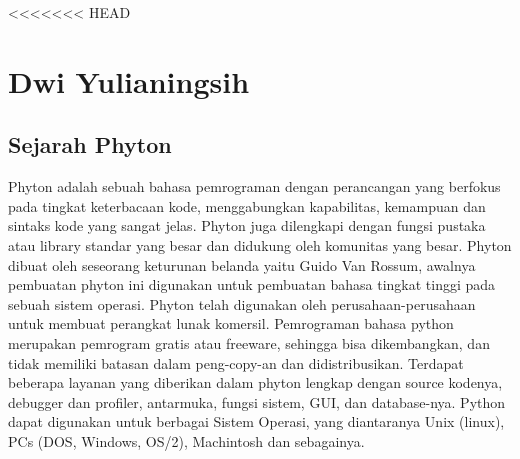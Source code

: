 <<<<<<< HEAD
\section{Dwi Yulianingsih}
\subsection{Sejarah Phyton}
Phyton adalah sebuah bahasa pemrograman dengan perancangan yang berfokus pada tingkat keterbacaan kode, menggabungkan kapabilitas, kemampuan dan sintaks kode yang sangat jelas. Phyton juga dilengkapi dengan fungsi pustaka atau library standar yang besar dan didukung oleh komunitas yang besar. Phyton dibuat oleh seseorang keturunan belanda yaitu Guido Van Rossum, awalnya pembuatan phyton ini digunakan untuk pembuatan bahasa tingkat tinggi pada sebuah sistem operasi. Phyton telah digunakan oleh perusahaan-perusahaan untuk membuat perangkat lunak komersil. Pemrograman bahasa python merupakan pemrogram gratis atau freeware, sehingga bisa dikembangkan, dan tidak memiliki batasan dalam peng-copy-an dan didistribusikan. Terdapat beberapa layanan yang diberikan dalam phyton lengkap dengan source kodenya, debugger dan profiler, antarmuka, fungsi sistem, GUI, dan database-nya. Python dapat digunakan untuk berbagai Sistem Operasi, yang diantaranya Unix (linux), PCs (DOS, Windows, OS/2), Machintosh dan sebagainya.

